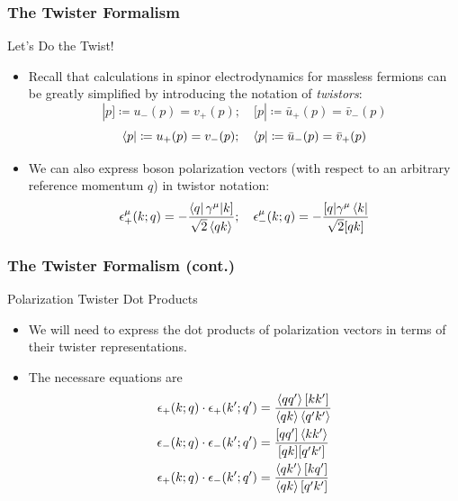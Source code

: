 \documentclass{beamer}
\begin{document}
\begin{frame}
    \frametitle{The Twister Formalism}
    \alert{Let's Do the Twist!}
    \begin{itemize}
        \item[\textbullet]<2-> Recall that calculations in spinor electrodynamics for massless fermions can be greatly simplified by introducing the notation of \textit{twistors}:\[ |p] \coloneqq u_-(p) = v_+(p); \quad [p| \coloneqq \bar{u}_+(p) = \bar{v}_-(p) \] \[ \bra{p} \coloneqq u_+(p) = v_-(p); \quad \bra{p} \coloneqq \bar{u}_-(p) = \bar{v}_+(p) \]
        \item[\textbullet]<3-> We can also express boson polarization vectors (with respect to an arbitrary reference momentum $q$) in twistor notation: \[ \epsilon_+^\mu(k;q) = -\frac{\bra{q}\gamma^\mu|k]}{\sqrt{2}\ev{qk}}; \quad \epsilon_-^\mu(k;q) = -\frac{[q|\gamma^\mu\bra{k}}{\sqrt{2}[qk]} \]
    \end{itemize}
\end{frame}

\begin{frame}
    \frametitle{The Twister Formalism (cont.)}
    \alert{Polarization Twister Dot Products}
    \begin{itemize}
        \item[\textbullet]<2-> We will need to express the dot products of polarization vectors in terms of their twister representations.
        \item[\textbullet]<3-> The necessare equations are
        \begin{align*}
            \epsilon_+(k;q)\cdot\epsilon_+(k';q') &= \frac{\ev{qq'}[kk']}{\ev{qk}\ev{q'k'}} \\
            \epsilon_-(k;q)\cdot\epsilon_-(k';q') &= \frac{[qq']\ev{kk'}}{[qk][q'k']} \\
            \epsilon_+(k;q)\cdot\epsilon_-(k';q') &= \frac{\ev{qk'}[kq']}{\ev{qk}[q'k']}
        \end{align*} 
    \end{itemize}
\end{frame}
\end{document}
